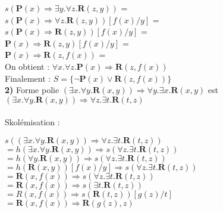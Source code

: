\documentclass{article}
\begin{document}
$s(\textbf{P}(x) \Rightarrow \exists y. \forall z. \textbf{R}(z,y))$ = \\

$s(\textbf{P}(x) \Rightarrow  \forall z. \textbf{R}(z,y))[f(x)/y]$ = \\

$s(\textbf{P}(x) \Rightarrow  \textbf{R}(z,y))[f(x)/y]$ = \\

$\textbf{P}(x) \Rightarrow  \textbf{R}(z,y)[f(x)/y]$ = \\

$\textbf{P}(x) \Rightarrow  \textbf{R}(z,f(x))$ = \\

On obtient : $\forall x. \forall z.  \textbf{P}(x) \Rightarrow \textbf{R}(z,f(x))$ \\



Finalement : $ S=\{ \neg \textbf{P}(x) \vee \textbf{R}(z,f(x)) \} $ \\

\textbf{2)}  Forme polie  $(\exists x.\forall y.\textbf{R}(x,y)) \Rightarrow \forall y.\exists x.\textbf{R}(x,y)$ est $(\exists x.\forall y.\textbf{R}(x,y)) \Rightarrow \forall z.\exists t.\textbf{R}(t,z)$\\
\\

Skolémisation : 

$s((\exists x.\forall y.\textbf{R}(x,y)) \Rightarrow \forall z.\exists t.\textbf{R}(t,z))$\\

$= h(\exists x.\forall y.\textbf{R}(x,y)) \Rightarrow s(\forall z.\exists t.\textbf{R}(t,z))$\\

$= h(\forall y.\textbf{R}(x,y)) \Rightarrow s(\forall z.\exists t.\textbf{R}(t,z))$\\

$= h(\textbf{R}(x,y))[f(x)/y] \Rightarrow s(\forall z.\exists t.\textbf{R}(t,z))$\\

$= \textbf{R}(x,f(x)) \Rightarrow s(\forall z.\exists t.\textbf{R}(t,z))$\\

$= \textbf{R}(x,f(x)) \Rightarrow s(\exists t.\textbf{R}(t,z))$\\

$= R(x,f(x)) \Rightarrow s(\textbf{R}(t,z))[g(z)/t]$\\

$= \textbf{R}(x,f(x)) \Rightarrow \textbf{R}(g(z),z)$\\
\end{document}
